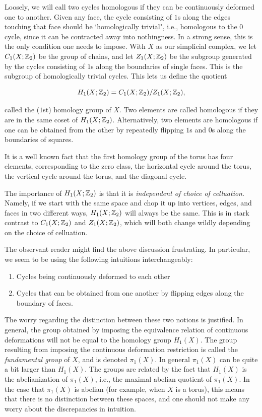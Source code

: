 \documentclass{article}
\theoremstyle{definition}
\numberwithin{figure}{section}
\begin{document}
Loosely, we will call two cycles homologous if they can be continuously deformed one to another. Given any face, the cycle consisting of $1$s along the edges touching that face should be `homologically trivial", i.e., homologous to the $0$ cycle, since it can be contracted away into nothingness. In a strong sense, this is the only condition one needs to impose. With $X$ as our simplicial complex, we let $C_1(X;\mathbb{Z}_2)$ be the group of chains, and let $Z_1(X;\mathbb{Z}_2)$ be the subgroup generated by the cycles consisting of $1$s along the boundaries of single faces. This is the subgroup of homologically trivial cycles. This lets us define the quotient

$$H_1(X;\mathbb{Z}_2)=C_1(X;\mathbb{Z}_2)/Z_1(X;\mathbb{Z}_2),$$

called the ($1$st) homology group of $X$. Two elements are called homologous if they are in the same coset of $H_1(X;\mathbb{Z}_2)$. Alternatively, two elements are homologous if one can be obtained from the other by repeatedly flipping $1$s and $0$s along the boundaries of squares.

It is a well known fact that the first homology group of the torus has four elements, corresponding to the zero class, the horizontal cycle around the torus, the vertical cycle around the torus, and the diagonal cycle.

The importance of $H_1(X;\mathbb{Z}_2)$ is that it is \textit{independent of choice of celluation}. Namely, if we start with the same space and chop it up into vertices, edges, and faces in two different ways, $H_1(X;\mathbb{Z}_2)$ will always be the same. This is in stark contrast to $C_1(X;\mathbb{Z}_2)$ and $Z_1(X;\mathbb{Z}_2)$, which will both change wildly depending on the choice of celluation.

The observant reader might find the above discussion frustrating. In particular, we seem to be using the following intuitions interchangeably:

\begin{enumerate}
\item Cycles being continuously deformed to each other
\item Cycles that can be obtained from one another by flipping edges along the boundary of faces.
\end{enumerate}

The worry regarding the distinction between these two notions is justified. In general, the group obtained by imposing the equivalence relation of continuous deformations will not be equal to the homology group $H_1(X)$. The group resulting from imposing the continuous deformation restriction is called the \textit{fundamental group} of $X$, and is denoted $\pi_1(X)$. In general $\pi_1(X)$ can be quite a bit larger than $H_1(X)$. The groups are related by the fact that $H_1(X)$ is the abelianization of $\pi_1(X)$, i.e., the maximal abelian quotient of $\pi_1(X)$. In the case that $\pi_1(X)$ is abelian (for example, when $X$ is a torus), this means that there is no distinction between these spaces, and one should not make any worry about the discrepancies in intuition.
\end{document}
